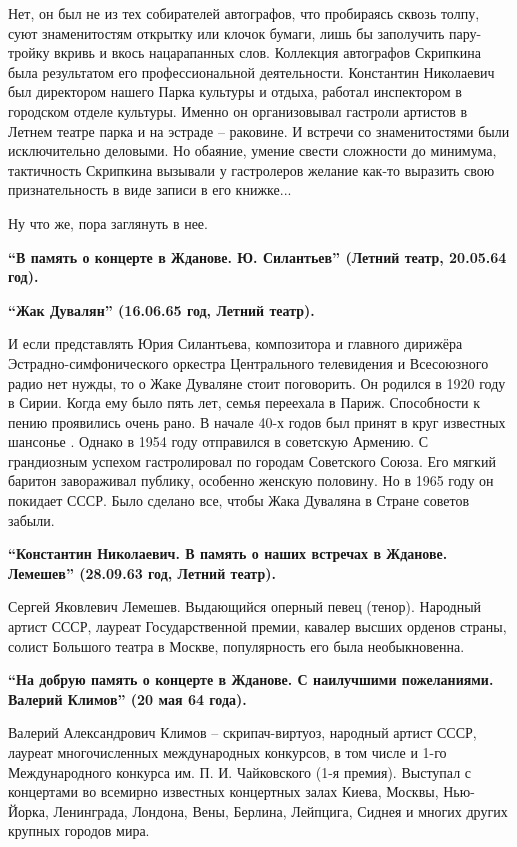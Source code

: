 Нет, он был не из тех собирателей автографов, что пробираясь сквозь толпу, суют
знаменитостям открытку или клочок бумаги, лишь бы заполучить пару-тройку вкривь
и вкось нацарапанных слов. Коллекция автографов Скрипкина была результатом его
профессиональной деятельности. Константин Николаевич был директором нашего
Парка культуры и отдыха, работал инспектором в городском отделе культуры.
Именно он организовывал гастроли артистов в Летнем театре парка и на эстраде –
раковине. И встречи со знаменитостями были исключительно деловыми. Но обаяние,
умение свести сложности до минимума, тактичность Скрипкина вызывали у
гастролеров желание как-то выразить свою признательность в виде записи в его
книжке...

Ну что же, пора заглянуть в нее. 

\textbf{\enquote{В память о концерте в Жданове. Ю. Силантьев} (Летний театр, 20.05.64 год).}

\textbf{\enquote{Жак Дувалян} (16.06.65 год, Летний театр).}

И если представлять Юрия Силантьева, композитора и главного дирижёра
Эстрадно-симфонического оркестра Центрального телевидения и Всесоюзного радио
нет нужды, то о Жаке Дуваляне стоит поговорить. Он родился в 1920 году в Сирии.
Когда ему было пять лет, семья переехала в Париж. Способности к пению
проявились очень рано. В начале 40-х годов был принят в круг известных шансонье
. Однако в 1954 году отправился в советскую Армению. С грандиозным успехом
гастролировал по городам Советского Союза. Его мягкий баритон завораживал
публику, особенно женскую половину. Но в 1965 году он покидает СССР. Было
сделано все, чтобы Жака Дуваляна в Стране советов забыли.

\textbf{\enquote{Константин Николаевич. В память о наших встречах в Жданове. Лемешев} (28.09.63 год, Летний театр).}

Сергей Яковлевич Лемешев. Выдающийся оперный певец (тенор). Народный артист
СССР, лауреат Государственной премии, кавалер высших орденов страны, солист
Большого театра в Москве, популярность его была необыкновенна. 

\textbf{\enquote{На добрую память о концерте в Жданове. С наилучшими пожеланиями. Валерий
Климов} (20 мая 64 года).}

Валерий Александрович Климов – скрипач-виртуоз, народный артист СССР, лауреат
многочисленных международных конкурсов, в том числе и 1-го Международного
конкурса им. П. И. Чайковского (1-я премия). Выступал с концертами во всемирно
известных концертных залах Киева, Москвы, Нью-Йорка, Ленинграда, Лондона, Вены,
Берлина, Лейпцига, Сиднея и многих других крупных городов мира.

